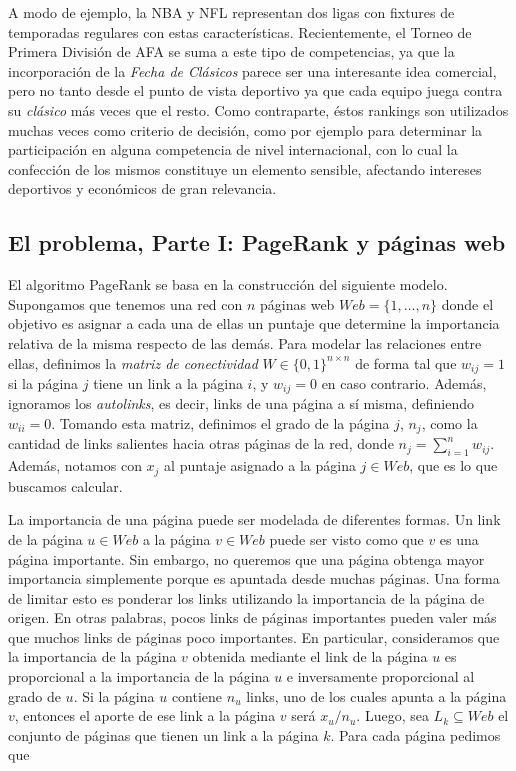        A modo de ejemplo, la NBA y NFL representan dos ligas con fixtures de temporadas regulares con estas caracter\'isticas. Recientemente, el Torneo de Primera Divisi\'on de AFA se suma a este tipo de competencias, ya que la incorporaci\'on de la \emph{Fecha de Cl\'asicos} parece ser una interesante idea comercial, pero no tanto desde el punto de vista deportivo ya que cada equipo juega contra su \emph{cl\'asico} m\'as veces que el resto. Como contraparte, \'estos rankings son utilizados muchas veces como criterio de decisi\'on, como por ejemplo para determinar la participaci\'on en alguna competencia de nivel internacional, con lo cual la confecci\'on de los mismos constituye un elemento sensible, afectando intereses deportivos y econ\'omicos de gran relevancia.

    \subsection*{El problema, Parte I: PageRank y p\'aginas web}

        El algoritmo PageRank se basa en la construcci\'on del siguiente modelo. Supongamos que tenemos una red con $n$ p\'aginas web $Web = \{1,\dots,n\}$ donde el objetivo es asignar a cada una de ellas un puntaje que determine la importancia relativa de la misma respecto de las dem\'as. Para modelar las relaciones entre ellas, definimos la \emph{matriz de conectividad} $W \in \{0,1\}^{n \times n}$ de forma tal que $w_{ij} = 1$ si la p\'agina $j$ tiene un link a la p\'agina $i$, y $w_{ij} = 0$ en caso contrario. Adem\'as, ignoramos los \emph{autolinks}, es decir, links de una p\'agina a s\'i misma, definiendo $w_{ii} = 0$. Tomando esta matriz, definimos el grado de la p\'agina $j$, $n_j$, como la cantidad de links salientes hacia otras p\'aginas de la red, donde $n_j = \sum_{i = 1}^n w_{ij}$. Adem\'as, notamos con $x_j$ al puntaje asignado a la p\'agina $j\in Web$, que es lo que buscamos calcular.

        La importancia de una p\'agina puede ser modelada de diferentes formas. Un link de la p\'agina $u \in Web$ a la p\'agina $v \in Web$ puede ser visto como que $v$ es una p\'agina importante. Sin embargo, no queremos que una p\'agina obtenga mayor importancia simplemente porque es apuntada desde muchas p\'aginas. Una forma de limitar esto es ponderar los links utilizando la importancia de la p\'agina de origen. En otras palabras, pocos links de p\'aginas importantes pueden valer m\'as que muchos links de p\'aginas poco importantes. En particular, consideramos que la importancia de la p\'agina $v$ obtenida mediante el link de la p\'agina $u$ es proporcional a la importancia de la p\'agina $u$ e inversamente proporcional al grado de $u$. Si la p\'agina $u$ contiene $n_u$ links, uno de los cuales apunta a la p\'agina $v$, entonces el aporte de ese link a la p\'agina $v$ ser\'a $x_u/n_u$. Luego, sea $L_k \subseteq Web$ el conjunto de p\'aginas que tienen un link a la p\'agina $k$. Para cada p\'agina pedimos que

